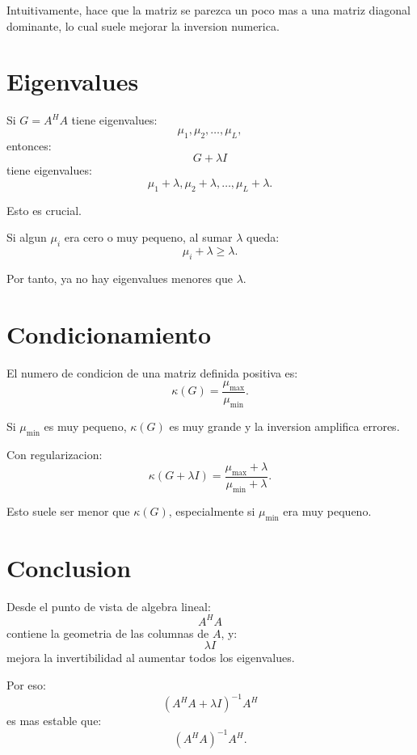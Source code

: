 \documentclass[11pt]{article}
\begin{document}
Intuitivamente, hace que la matriz se parezca un poco mas a una matriz diagonal
dominante, lo cual suele mejorar la inversion numerica.

\section{Eigenvalues}

Si \(G=A^H A\) tiene eigenvalues:
\[
    \mu_1,\mu_2,\ldots,\mu_L,
\]
entonces:
\[
    G+\lambda I
\]
tiene eigenvalues:
\[
    \mu_1+\lambda,\mu_2+\lambda,\ldots,\mu_L+\lambda.
\]

Esto es crucial.

Si algun \(\mu_i\) era cero o muy pequeno, al sumar \(\lambda\) queda:
\[
    \mu_i+\lambda \ge \lambda.
\]

Por tanto, ya no hay eigenvalues menores que \(\lambda\).

\section{Condicionamiento}

El numero de condicion de una matriz definida positiva es:
\[
    \kappa(G) = \frac{\mu_{\max}}{\mu_{\min}}.
\]

Si \(\mu_{\min}\) es muy pequeno, \(\kappa(G)\) es muy grande y la inversion
amplifica errores.

Con regularizacion:
\[
    \kappa(G+\lambda I)
    =
    \frac{\mu_{\max}+\lambda}{\mu_{\min}+\lambda}.
\]

Esto suele ser menor que \(\kappa(G)\), especialmente si \(\mu_{\min}\) era muy
pequeno.

\section{Conclusion}

Desde el punto de vista de algebra lineal:
\[
    A^H A
\]
contiene la geometria de las columnas de \(A\), y:
\[
    \lambda I
\]
mejora la invertibilidad al aumentar todos los eigenvalues.

Por eso:
\[
    (A^H A + \lambda I)^{-1}A^H
\]
es mas estable que:
\[
    (A^H A)^{-1}A^H.
\]
\end{document}
